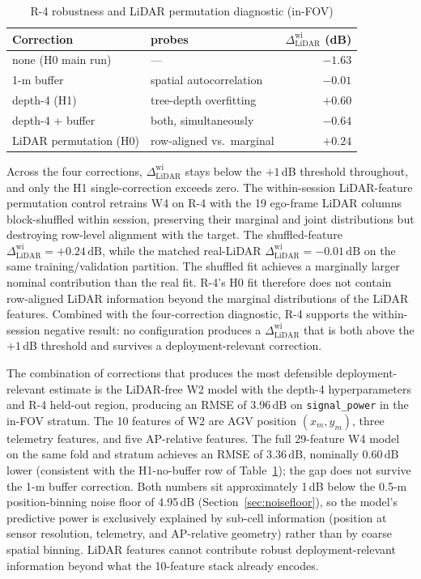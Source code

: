 \documentclass[conference]{IEEEtran}
\newcommand{\dlidarw}{\ensuremath{\Delta_{\mathrm{LiDAR}}^{\mathrm{wi}}}}
\newcommand{\dB}{\,\mathrm{dB}}
\begin{document}
\vspace{-1pt}
\begin{table}[!htbp]
    \caption{R-4 robustness and LiDAR permutation diagnostic (in-FOV)}
    \label{tab:r4-diag}
    \centering
    \setlength{\tabcolsep}{3pt}
    \footnotesize
    \begin{tabularx}{\columnwidth}{l X r}
        \toprule
        Correction & probes & $\dlidarw$ (dB) \\
        \midrule
        none (H0 main run) & --- & $-1.63$ \\
        1-m buffer & spatial autocorrelation  & $-0.01$ \\
        depth-4 (H1) & tree-depth overfitting & $+0.60$ \\
        depth-4 + buffer & both, simultaneously & $-0.64$ \\
        \midrule
        LiDAR permutation (H0) & row-aligned vs.\ marginal & $+0.24$ \\
        \bottomrule
    \end{tabularx}
\end{table}

Across the four corrections, $\dlidarw$ stays below the $+1\,$dB threshold throughout, and only the H1 single-correction exceeds zero. 
The within-session LiDAR-feature permutation control retrains W4 on R-4 with the 19 ego-frame LiDAR columns block-shuffled within session, preserving their marginal and joint distributions but destroying row-level alignment with the target. The shuffled-feature $\dlidarw = +0.24\dB$, while the matched real-LiDAR $\dlidarw = -0.01\dB$ on the same training/validation partition. The shuffled fit achieves a marginally larger nominal contribution than the real fit. R-4's H0 fit therefore does not contain row-aligned LiDAR information beyond the marginal distributions of the LiDAR features. Combined with the four-correction diagnostic, R-4 supports the within-session negative result: no configuration produces a $\dlidarw$ that is both above the $+1\,$dB threshold and survives a deployment-relevant correction.

The combination of corrections that produces the most defensible deployment-relevant estimate is the LiDAR-free W2 model with the depth-4 hyperparameters and R-4 held-out region, producing an RMSE of $3.96\dB$ on \texttt{signal\_power}  in the in-FOV stratum. The 10 features of W2 are AGV position $(x_m, y_m)$, three telemetry features, and five AP-relative features. The full 29-feature W4 model on the same fold and stratum achieves an RMSE of $3.36\dB$, nominally $0.60\dB$ lower (consistent with the H1-no-buffer row of Table~\ref{tab:r4-diag}); the gap does not survive the 1-m buffer correction. Both numbers sit approximately 1\,dB below the 0.5-m position-binning noise floor of 4.95\,dB (Section~\ref{sec:noisefloor}), so the model's predictive power is exclusively explained by sub-cell information (position at sensor resolution, telemetry, and AP-relative geometry) rather than by coarse spatial binning. LiDAR features cannot contribute robust deployment-relevant information beyond what the 10-feature stack already encodes.
\end{document}
